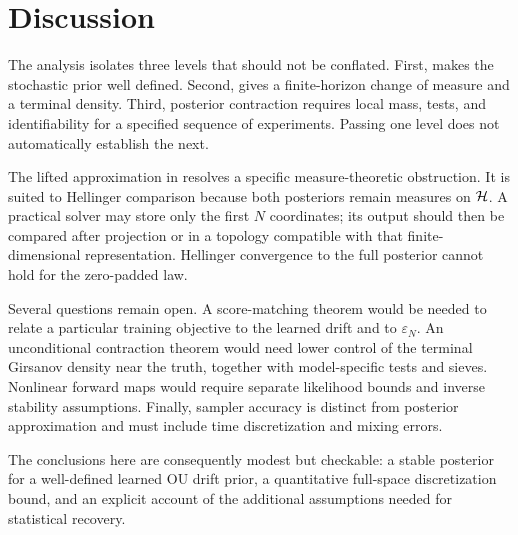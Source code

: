 \section{Discussion}
\label{sec:discussion}

The analysis isolates three levels that should not be conflated.
First,  makes the stochastic prior well defined.
Second,  gives a finite-horizon change of measure and
a terminal density.  Third, posterior contraction requires local mass,
tests, and identifiability for a specified sequence of experiments.
Passing one level does not automatically establish the next.

The lifted approximation in  resolves a specific
measure-theoretic obstruction.  It is suited to Hellinger comparison
because both posteriors remain measures on $\mathcal{H}$.  A practical solver
may store only the first $N$ coordinates; its output should then be
compared after projection or in a topology compatible with that
finite-dimensional representation.  Hellinger convergence to the full
posterior cannot hold for the zero-padded law.

Several questions remain open.  A score-matching theorem would be
needed to relate a particular training objective to the learned drift
and to $\varepsilon_N$.  An unconditional contraction theorem would
need lower control of the terminal Girsanov density near the truth,
together with model-specific tests and sieves.  Nonlinear forward maps
would require separate likelihood bounds and inverse stability
assumptions.  Finally, sampler accuracy is distinct from posterior
approximation and must include time discretization and mixing errors.

The conclusions here are consequently modest but checkable: a stable
posterior for a well-defined learned OU drift prior, a quantitative
full-space discretization bound, and an explicit account of the
additional assumptions needed for statistical recovery.
